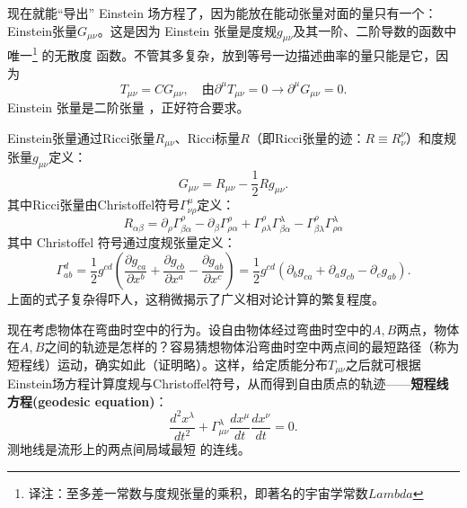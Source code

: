 
现在就能“导出” Einstein 场方程了，因为能放在能动张量对面的量只有一个：Einstein张量$G_{\mu \nu}$。这是因为 Einstein 张量是度规$g_{\mu \nu}$及其一阶、二阶导数的函数中唯一\footnote{译注：至多差一常数与度规张量的乘积，即著名的宇宙学常数$Lambda$} 的无散度%
%
函数。不管其多复杂，放到等号一边描述曲率的量只能是它，因为
\begin{equation}
\label{equ12.3}
    T_{\mu \nu} = C G_{\mu \nu}, \quad \text{由} \partial^\mu T_{\mu \nu} = 0 \to \partial^\mu G_{\mu \nu} = 0.
\end{equation}
Einstein 张量是二阶张量%
%
，正好符合要求。

Einstein张量通过Ricci张量$R_{\mu \nu}$、Ricci标量$R$（即Ricci张量的迹：$R \equiv R^\nu_\nu$）和度规张量$g_{\mu \nu}$定义：
\begin{equation}
\label{equ12.4}
    G_{\mu \nu} = R_{\mu \nu} - \frac{1}{2} R g_{\mu \nu}.
\end{equation}
其中Ricci张量由Christoffel符号$\Gamma^\mu_{\nu \rho}$定义：
\begin{equation}
\label{equ12.5}
    R_{\alpha \beta} = \partial_\rho \Gamma^\rho_{\beta \alpha} - \partial_\beta \Gamma^\rho_{\rho \alpha} + \Gamma^\rho_{\rho \lambda} \Gamma^\lambda_{\beta \alpha} - \Gamma^\rho_{\beta \lambda} \Gamma^\lambda_{\rho \alpha}
\end{equation}
其中 Christoffel 符号通过度规张量定义：
\begin{equation}
\label{equ12.6}
    \Gamma^d_{ab} = \frac{1}{2} g^{cd} \left( \frac{\partial g_{ca}}{\partial x^b} + \frac{\partial g_{cb}}{\partial x^a} - \frac{\partial g_{ab}}{\partial x^c} \right) = \frac{1}{2} g^{cd} (\partial_b g_{ca} + \partial_a g_{cb} - \partial_c g_{ab}).
\end{equation}
上面的式子复杂得吓人，这稍微揭示了广义相对论计算的繁复程度。

现在考虑物体在弯曲时空中的行为。设自由物体经过弯曲时空中的$A, B$两点，物体在$A, B$之间的轨迹是怎样的？容易猜想物体沿弯曲时空中两点间的最短路径（称为短程线）运动，确实如此（证明略）。这样，给定质能分布$T_{\mu \nu}$之后就可根据Einstein场方程计算度规与Christoffel符号，从而得到自由质点的轨迹——{\bfseries 短程线方程(geodesic equation)}：
\begin{equation}
\label{equ12.7}
    \frac{d^2 x^\lambda}{dt^2} + \Gamma^\lambda_{\mu \nu} \frac{d x^\mu}{dt} \frac{d x^\nu}{dt} = 0.
\end{equation}
测地线是流形上的两点间局域最短%
%
的连线。

